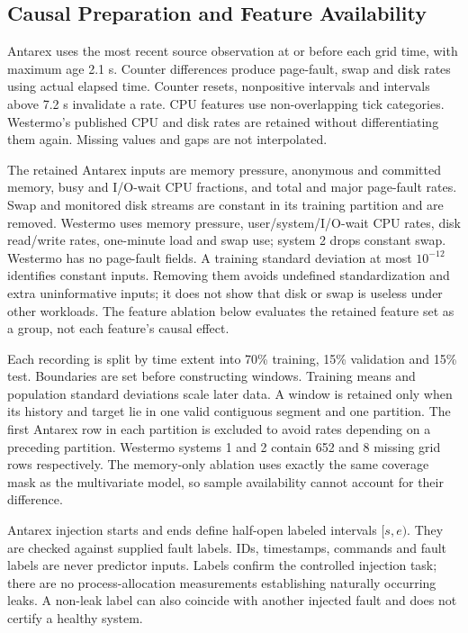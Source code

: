 \documentclass{llncs}
\begin{document}
\subsection{Causal Preparation and Feature Availability}
Antarex uses the most recent source observation at or before each grid time, with maximum age 2.1 s. Counter differences produce page-fault, swap and disk rates using actual elapsed time. Counter resets, nonpositive intervals and intervals above 7.2 s invalidate a rate. CPU features use non-overlapping tick categories. Westermo's published CPU and disk rates are retained without differentiating them again. Missing values and gaps are not interpolated.

The retained Antarex inputs are memory pressure, anonymous and committed memory, busy and I/O-wait CPU fractions, and total and major page-fault rates. Swap and monitored disk streams are constant in its training partition and are removed. Westermo uses memory pressure, user/system/I/O-wait CPU rates, disk read/write rates, one-minute load and swap use; system 2 drops constant swap. Westermo has no page-fault fields. A training standard deviation at most $10^{-12}$ identifies constant inputs. Removing them avoids undefined standardization and extra uninformative inputs; it does not show that disk or swap is useless under other workloads. The feature ablation below evaluates the retained feature set as a group, not each feature's causal effect.

Each recording is split by time extent into 70\% training, 15\% validation and 15\% test. Boundaries are set before constructing windows. Training means and population standard deviations scale later data. A window is retained only when its history and target lie in one valid contiguous segment and one partition. The first Antarex row in each partition is excluded to avoid rates depending on a preceding partition. Westermo systems 1 and 2 contain 652 and 8 missing grid rows respectively. The memory-only ablation uses exactly the same coverage mask as the multivariate model, so sample availability cannot account for their difference.

Antarex injection starts and ends define half-open labeled intervals $[s,e)$. They are checked against supplied fault labels. IDs, timestamps, commands and fault labels are never predictor inputs. Labels confirm the controlled injection task; there are no process-allocation measurements establishing naturally occurring leaks. A non-leak label can also coincide with another injected fault and does not certify a healthy system.
\end{document}
